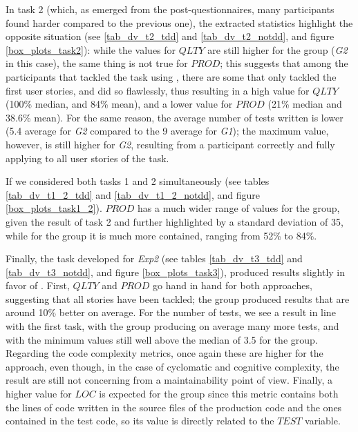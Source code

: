 In task 2 (which, as emerged from the post-questionnaires, many participants found harder compared to the previous one), the extracted statistics highlight the opposite situation (see \ref{tab_dv_t2_tdd} and \ref{tab_dv_t2_notdd}, and figure \ref{box_plots_task2}):
while the values for $QLTY$ are still higher for the \tdd group (\textit{G2} in this case), the same thing is not true for $PROD$; this suggests that among the participants that tackled the task using \tdd, there are some that only tackled the first user stories, and did so flawlessly, thus resulting in a high value for $QLTY$ (100\% median, and 84\% mean), and a lower value for $PROD$ (21\% median and 38.6\% mean). 
For the same reason, the average number of tests written is lower (5.4 average for \textit{G2} compared to the 9 average for \textit{G1}); the maximum value, however, is still higher for \textit{G2}, resulting from a participant correctly and fully applying \tdd to all user stories of the task.

If we considered both tasks 1 and 2 simultaneously (see tables \ref{tab_dv_t1_2_tdd} and \ref{tab_dv_t1_2_notdd}, and figure \ref{box_plots_task1_2}).
$PROD$ has a much wider range of values for the \tdd group, given the result of task 2 and further highlighted by a standard deviation of 35, while for the \notdd group it is much more contained, ranging from 52\% to 84\%.

Finally, the task developed for \textit{Exp2} (see tables \ref{tab_dv_t3_tdd} and \ref{tab_dv_t3_notdd}, and figure \ref{box_plots_task3}), produced results slightly in favor of \tdd.
First, $QLTY$ and $PROD$ go hand in hand for both approaches, suggesting that all stories have been tackled; the \tdd group produced results that are around 10\% better on average.
For the number of tests, we see a result in line with the first task, with the \tdd group producing on average many more tests, and with the minimum values still well above the median of 3.5 for the \notdd group.
Regarding the code complexity metrics, once again these are higher for the \tdd approach, even though, in the case of cyclomatic and cognitive complexity, the result are still not concerning from a maintainability point of view.
Finally, a higher value for $LOC$ is expected for the \tdd group since this metric contains both the lines of code written in the source files of the production code and the ones contained in the test code, so its value is directly related to the $TEST$ variable.



